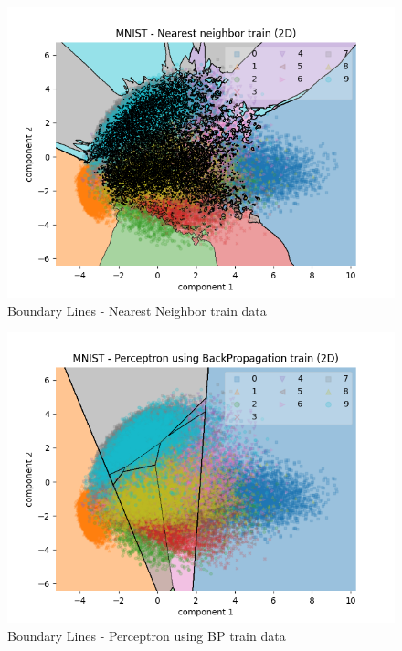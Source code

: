 \begin{figure}
        \centering
        \includegraphics[width=1\columnwidth]{../source/mnist/pictures/nearestNeighbor-5-boundary-train.png}
        \caption{Boundary Lines - Nearest Neighbor train data}
        \label{fig:mnist-boundary-nn}
\end{figure}

\begin{figure}
        \centering
        \includegraphics[width=1\columnwidth]{../source/mnist/pictures/perceptronBP-boundary-train.png}
        \caption{Boundary Lines - Perceptron using BP train data}
        \label{fig:mnist-boundary-pbp}
\end{figure}

